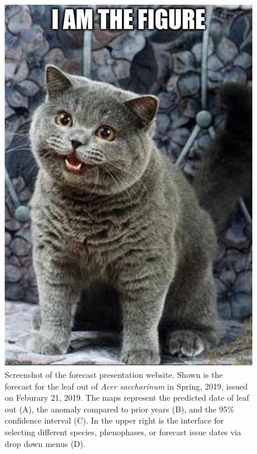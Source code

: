 \begin{figure}
	\centering
		\includegraphics[scale=0.3]{images/figure_filler.jpg}
	\caption[Screenshot of the forecast presentation website]{Screenshot of the forecast presentation website. Shown is the forecast for the leaf out of \textit{Acer saccharinum} in Spring, 2019, issued on Feburary 21, 2019. The maps represent the predicted date of leaf out (A), the anomaly compared to prior years (B), and the 95\% confidence interval (C). In the upper right is the interface for selecting different species, phenophases, or forecast issue dates via drop down menus (D).} \label{fig-4-2}
\end{figure}

